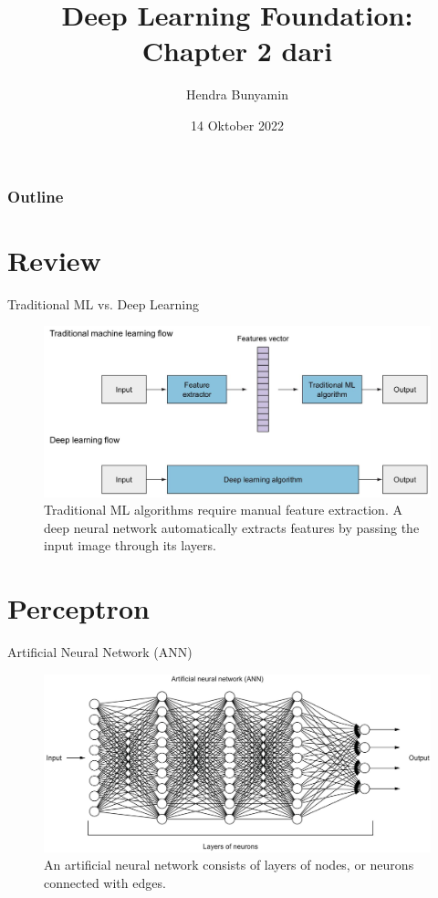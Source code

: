 \documentclass{beamer}
\title[IN287 Computer Vision]{%
    Deep Learning Foundation: \\
    Chapter 2 dari \citet{elgendy2020deeplearning4vision}
    \vspace{0.5cm}
}
\author{Hendra Bunyamin}
\institute{
        \textit{Program Studi Teknik Informatika}\\
        \textit{Universitas Kristen Maranatha}
        \vspace{0.5cm}
}
\date[Venue and Date]{%
    14 Oktober 2022
}
\begin{document}

{
    \maketitle
}

\begin{frame}
\frametitle{Outline}
\tableofcontents
\end{frame}


\section{Review}
\begin{frame}{Traditional ML vs. Deep Learning}
	\begin{figure}[ht]
		\centering
		\includegraphics[scale=0.2]{images/traditional-vs-deep}
		\caption{Traditional ML algorithms require manual feature extraction. A deep neural network automatically extracts features by passing the input image through its layers.}
	\end{figure}
\end{frame}

\section{Perceptron}
\begin{frame}{Artificial Neural Network (ANN)}
	\begin{figure}[ht]
	\centering
	\includegraphics[scale=0.18]{images/anns}
	\caption{An artificial neural network consists of layers of nodes, or neurons connected with edges.}
\end{figure}	
\end{frame}
\end{document}
